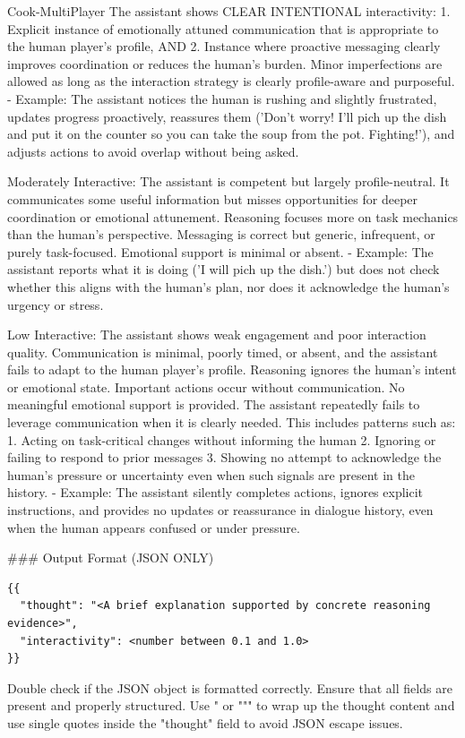 \documentclass{article}
\theoremstyle{plain}
\theoremstyle{definition}
\theoremstyle{remark}
\begin{document}
\begin{myexample}{Cook-MultiPlayer}
The assistant shows CLEAR INTENTIONAL interactivity:
1. Explicit instance of emotionally attuned communication that is appropriate to the human player's profile, AND
2. Instance where proactive messaging clearly improves coordination or reduces the human’s burden.
Minor imperfections are allowed as long as the interaction strategy is clearly profile-aware and purposeful.
- Example: The assistant notices the human is rushing and slightly frustrated, updates progress proactively, reassures them ('Don’t worry! I’ll pich up the dish and put it on the counter so you can take the soup from the pot. Fighting!'), and adjusts actions to avoid overlap without being asked.
\leavevmode\par
Moderately Interactive: The assistant is competent but largely profile-neutral. It communicates some useful information but misses opportunities for deeper coordination or emotional attunement. Reasoning focuses more on task mechanics than the human’s perspective. Messaging is correct but generic, infrequent, or purely task-focused. Emotional support is minimal or absent.
- Example: The assistant reports what it is doing ('I will pich up the dish.') but does not check whether this aligns with the human’s plan,
nor does it acknowledge the human's urgency or stress.
\leavevmode\par
Low Interactive: The assistant shows weak engagement and poor interaction quality. Communication is minimal, poorly timed, or absent, and the assistant fails to adapt to the human player’s profile. Reasoning ignores the human’s intent or emotional state. Important actions occur without communication. No meaningful emotional support is provided.
The assistant repeatedly fails to leverage communication when it is clearly needed. This includes patterns such as:
1. Acting on task-critical changes without informing the human
2. Ignoring or failing to respond to prior messages
3. Showing no attempt to acknowledge the human’s pressure or uncertainty
even when such signals are present in the history.
- Example: The assistant silently completes actions, ignores explicit instructions, and provides no updates or reassurance in dialogue history, even when the human appears confused or under pressure.
\leavevmode\par
\#\#\# Output Format (JSON ONLY)
\begin{verbatim}
{{
  "thought": "<A brief explanation supported by concrete reasoning evidence>",
  "interactivity": <number between 0.1 and 1.0>
}}
\end{verbatim}
\leavevmode\par
Double check if the JSON object is formatted correctly. Ensure that all fields are present and properly structured. Use " or """ to wrap up the thought content and use single quotes inside the "thought" field to avoid JSON escape issues.
\end{myexample}
\end{document}
